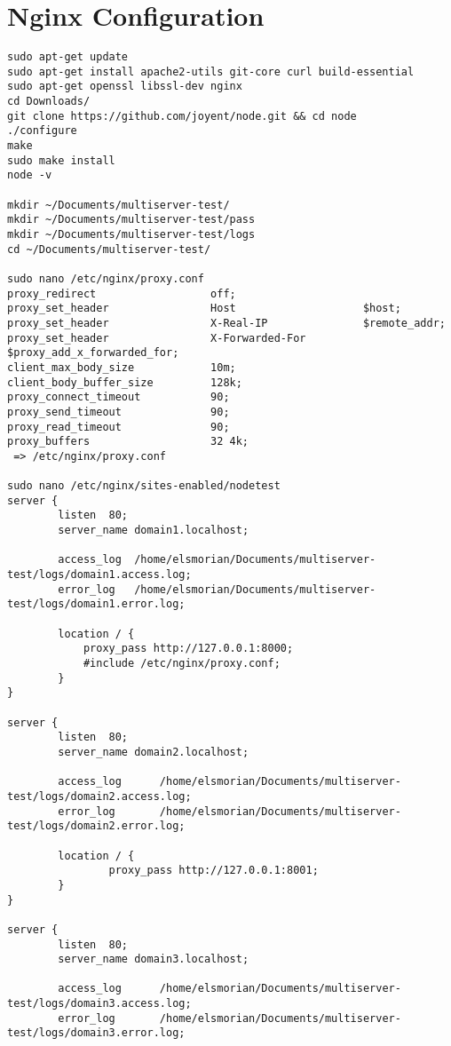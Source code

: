 \documentclass[A4paper,11pt]{article}
\begin{document}
\newpage
\section{Nginx Configuration}
\label{sec:NginxConfiguration}

\begin{lstlisting}
sudo apt-get update
sudo apt-get install apache2-utils git-core curl build-essential 
sudo apt-get openssl libssl-dev nginx
cd Downloads/
git clone https://github.com/joyent/node.git && cd node
./configure
make
sudo make install
node -v

mkdir ~/Documents/multiserver-test/
mkdir ~/Documents/multiserver-test/pass
mkdir ~/Documents/multiserver-test/logs
cd ~/Documents/multiserver-test/

sudo nano /etc/nginx/proxy.conf
proxy_redirect                  off;
proxy_set_header                Host                    $host;
proxy_set_header                X-Real-IP               $remote_addr;
proxy_set_header                X-Forwarded-For         $proxy_add_x_forwarded_for;
client_max_body_size            10m;
client_body_buffer_size         128k;
proxy_connect_timeout           90;
proxy_send_timeout              90;
proxy_read_timeout              90;
proxy_buffers                   32 4k;
 => /etc/nginx/proxy.conf

sudo nano /etc/nginx/sites-enabled/nodetest
server {
	    listen	80;
	    server_name domain1.localhost;

	    access_log 	/home/elsmorian/Documents/multiserver-test/logs/domain1.access.log;
	    error_log	/home/elsmorian/Documents/multiserver-test/logs/domain1.error.log;
	
	    location / {
		    proxy_pass http://127.0.0.1:8000;
		    #include /etc/nginx/proxy.conf;
	    }
}

server {
        listen  80;
        server_name domain2.localhost;

        access_log      /home/elsmorian/Documents/multiserver-test/logs/domain2.access.log;
        error_log       /home/elsmorian/Documents/multiserver-test/logs/domain2.error.log;

        location / {
                proxy_pass http://127.0.0.1:8001;
        }
}

server {
        listen  80;
        server_name domain3.localhost;

        access_log      /home/elsmorian/Documents/multiserver-test/logs/domain3.access.log;
        error_log       /home/elsmorian/Documents/multiserver-test/logs/domain3.error.log;


\end{lstlisting}
\end{document}
